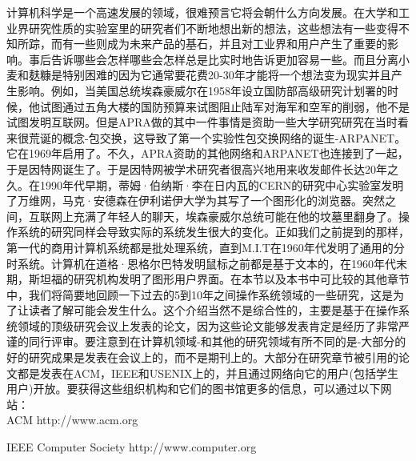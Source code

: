 	计算机科学是一个高速发展的领域，很难预言它将会朝什么方向发展。在大学和工业界研究性质的实验室里的研究者们不断地想出新的想法，这些想法有一些变得不知所踪，而有一些则成为未来产品的基石，并且对工业界和用户产生了重要的影响。事后告诉哪些会怎样哪些会怎样总是比实时地告诉更加容易一些。而且分离小麦和麸糠是特别困难的因为它通常要花费20-30年才能将一个想法变为现实并且产生影响。例如，当美国总统埃森豪威尔在1958年设立国防部高级研究计划署的时候，他试图通过五角大楼的国防预算来试图阻止陆军对海军和空军的削弱，他不是试图发明互联网。但是APRA做的其中一件事情是资助一些大学研究研究在当时看来很荒诞的概念-包交换，这导致了第一个实验性包交换网络的诞生-ARPANET。它在1969年启用了。不久，APRA资助的其他网络和ARPANET也连接到了一起，于是因特网诞生了。于是因特网被学术研究者很高兴地用来收发邮件长达20年之久。在1990年代早期，蒂姆·伯纳斯·李在日内瓦的CERN的研究中心实验室发明了万维网，马克·安德森在伊利诺伊大学为其写了一个图形化的浏览器。突然之间，互联网上充满了年轻人的聊天，埃森豪威尔总统可能在他的坟墓里翻身了。操作系统的研究同样会导致实际的系统发生很大的变化。正如我们之前提到的那样，第一代的商用计算机系统都是批处理系统，直到M.I.T在1960年代发明了通用的分时系统。计算机在道格·恩格尔巴特发明鼠标之前都是基于文本的，在1960年代末期，斯坦福的研究机构发明了图形用户界面。在本节以及本书中可比较的其他章节中，我们将简要地回顾一下过去的5到10年之间操作系统领域的一些研究，这是为了让读者了解可能会发生什么。这个介绍当然不是综合性的，主要是基于在操作系统领域的顶级研究会议上发表的论文，因为这些论文能够发表肯定是经历了非常严谨的同行评审。要注意到在计算机领域-和其他的研究领域有所不同的是-大部分的好的研究成果是发表在会议上的，而不是期刊上的。大部分在研究章节被引用的论文都是发表在ACM，IEEE和USENIX上的，并且通过网络向它的用户(包括学生用户)开放。要获得这些组织机构和它们的图书馆更多的信息，可以通过以下网站：	
	\\\indent ACM http://www.acm.org

	IEEE Computer Society http://www.computer.org

